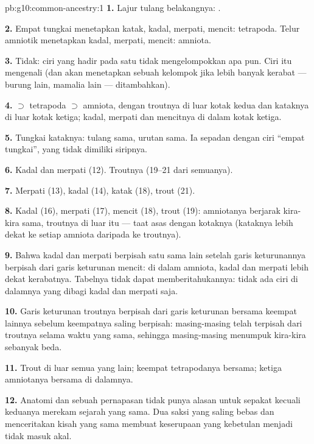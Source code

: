 \begin{solution}{pb:g10:common-ancestry:1}
\textbf{1.} Lajur tulang belakangnya: .

\textbf{2.} Empat tungkai menetapkan katak, kadal, merpati, mencit:
tetrapoda. Telur amniotik menetapkan kadal, merpati, mencit: amniota.

\textbf{3.} Tidak: ciri yang hadir pada satu  tidak
mengelompokkan apa pun. Ciri itu mengenali  (dan akan
menetapkan sebuah kelompok jika lebih banyak kerabat --- burung lain,
mamalia lain --- ditambahkan).

\textbf{4.}  $\supset$ tetrapoda $\supset$ amniota, dengan
troutnya di luar kotak kedua dan kataknya di luar kotak ketiga;
kadal, merpati dan mencitnya di dalam kotak ketiga.

\textbf{5.} Tungkai kataknya: tulang sama, urutan sama. Ia sepadan
dengan ciri ``empat tungkai'', yang tidak dimiliki siripnya.

\textbf{6.} Kadal dan merpati (12). Troutnya (19--21 dari semuanya).

\textbf{7.} Merpati (13), kadal (14), katak (18), trout (21).

\textbf{8.} Kadal (16), merpati (17), mencit (18), trout (19):
amniotanya berjarak kira-kira sama, troutnya di luar itu --- taat asas
dengan kotaknya (kataknya lebih dekat ke setiap amniota daripada ke troutnya).

\textbf{9.} Bahwa kadal dan merpati berpisah satu sama lain setelah
garis keturunannya berpisah dari garis keturunan mencit: di dalam
amniota, kadal dan merpati lebih dekat kerabatnya. Tabelnya tidak dapat
memberitahukannya: tidak ada ciri di dalamnya yang dibagi kadal dan merpati saja.

\textbf{10.} Garis keturunan troutnya berpisah dari garis keturunan
bersama keempat lainnya sebelum keempatnya saling berpisah:
masing-masing telah terpisah dari troutnya selama waktu yang sama,
sehingga masing-masing menumpuk kira-kira sebanyak beda.

\textbf{11.} Trout di luar semua yang lain; keempat tetrapodanya
bersama; ketiga amniotanya bersama di dalamnya.

\textbf{12.} Anatomi dan sebuah  pernapasan tidak punya alasan
untuk sepakat kecuali keduanya merekam sejarah yang sama. Dua saksi
yang saling bebas dan menceritakan kisah yang sama membuat keserupaan
yang kebetulan menjadi tidak masuk akal.


\end{solution}
